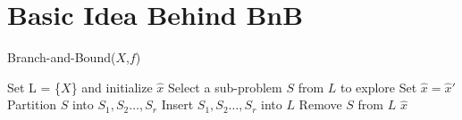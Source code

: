 \newpage
\section{Basic Idea Behind BnB}
		\begin{algorithm}[H]
			\caption{Branch-and-Bound($X$,$f$) \cite{huang2021branch}}
			\begin{algorithmic}[1]
				\State Set L = \{$X$\} and initialize $\hat{x}$
					\State Select a sub-problem $S$ from $L$ to explore
					\State Set $\hat{x} = \hat{x}'$
					\EndIf
					\State Partition $S$ into $S_1, S_2 \dots ,S_r$
					\State Insert $S_1, S_2 \dots ,S_r$ into $L$
					\EndIf
					\State Remove $S$ from $L$
				\EndWhile
				\State \Return $\hat{x}$
			\end{algorithmic}
		\label{alg: pseudocode}
		\end{algorithm}

		
		
		
		
